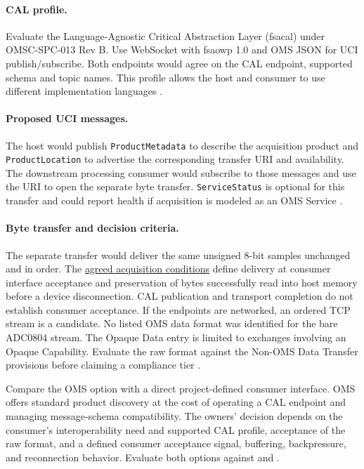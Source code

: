 \paragraph{CAL profile.}
Evaluate the Language-Agnostic Critical Abstraction Layer (\acrshort{fsacal})
under OMSC-SPC-013 Rev B.
Use WebSocket with \gls{fsaowp} 1.0 and OMS JSON for UCI publish/subscribe.
Both endpoints would agree on the CAL endpoint, supported schema and topic
names. This profile allows the host and consumer to use different implementation
languages \cite{OMSVDD25,OMSPDD25}.

\paragraph{Proposed UCI messages.}
The host would publish \texttt{ProductMetadata} to describe the acquisition
product and \texttt{ProductLocation} to advertise the corresponding transfer
URI and availability. The downstream processing consumer would subscribe to
those messages and use the URI to open the separate byte transfer.
\texttt{ServiceStatus} is optional for this transfer and could report health
if acquisition is modeled as an OMS Service \cite{OMSStandard25}.

\paragraph{Byte transfer and decision criteria.}
The separate transfer would deliver the same unsigned 8-bit samples unchanged
and in order. The \hyperref[Section:ProjectAcquisitionConditions]{agreed
acquisition conditions} define delivery at consumer interface acceptance and
preservation of bytes successfully read into host memory before a device
disconnection. CAL publication and transport completion do not establish
consumer acceptance. If the endpoints are networked, an ordered TCP stream
is a candidate. No listed OMS data format was identified for the bare ADC0804
stream. The Opaque Data entry is limited to exchanges involving an Opaque
Capability. Evaluate the raw format against the Non-OMS Data Transfer
provisions before claiming a compliance tier \cite{OMSStandard25}.

Compare the OMS option with a direct project-defined consumer interface.
OMS offers standard product discovery at the cost of operating a CAL endpoint
and managing message-schema compatibility. The owners' decision depends on
the consumer's interoperability need and supported CAL profile, acceptance of
the raw format, and a defined consumer acceptance signal, buffering,
backpressure, and reconnection behavior. Evaluate both options against
 and .

